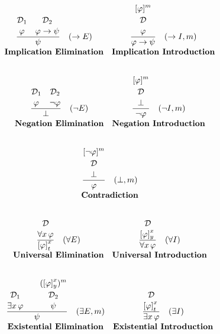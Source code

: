 \[
\begin{array}{c c}
\frac{\overset{\displaystyle\mathcal{D}_1\strut}{\displaystyle \varphi \strut}\quad \overset{\displaystyle\mathcal{D}_2\strut} {\displaystyle \varphi \to \psi \strut}}{\displaystyle\psi\strut} \quad (\to E) 
& \frac{\overset{\displaystyle[\varphi]^m\strut}{\overset{\displaystyle\mathcal{D} \strut} {\displaystyle\varphi 
\strut}}}{\displaystyle \varphi \to \psi \strut} \quad (\to I, m) \\[5pt]
\textbf{Implication Elimination} & \textbf{Implication Introduction}\\[10pt]
\end{array}
\]

\[
\begin{array}{c c}
\frac{\overset{\displaystyle\mathcal{D}_1\strut}{\displaystyle \varphi \strut}\quad \overset{\displaystyle\mathcal{D}_2\strut} {\displaystyle \neg \varphi \strut}}{\displaystyle\bot\strut} \quad (\neg E) 
& \frac{\overset{\displaystyle[\varphi]^m\strut}{\overset{\displaystyle\mathcal{D} \strut} {\displaystyle\bot 
\strut}}}{\displaystyle\neg \varphi\strut} \quad (\neg I, m) \\[5pt]
\textbf{Negation Elimination} & \textbf{Negation Introduction}\\[10pt]
\end{array}
\]

\[
\begin{array}{c c}
\multicolumn{2}{c}{
\frac{\overset{\displaystyle[\neg\varphi]^m\strut}{\overset{\displaystyle\mathcal{D} \strut} {\displaystyle\bot 
\strut}}}{\displaystyle \varphi\strut} \quad (\bot, m)
} \\[5pt]
\multicolumn{2}{c}{\textbf{Contradiction}} \\[10pt]
\end{array}
\]

\[
\begin{array}{c c}
\frac{{\overset{\displaystyle\mathcal{D} \strut} {\displaystyle\forall x \, \varphi 
\strut}}}{\displaystyle\left[ \varphi \right]^x_{\substack{t}}\strut} \quad (\forall E)
& \frac{{\overset{\displaystyle\mathcal{D} \strut} {\displaystyle\left[ \varphi\right]^x_{\substack{y}} 
\strut}}}{\displaystyle\forall x \, \varphi\strut} \quad (\forall I) \\[5pt]
\textbf{Universal Elimination} & \textbf{Universal Introduction}\\[10pt]
\end{array}
\]

\[
\begin{array}{c c}
\frac{\overset{\displaystyle\mathcal{D}_1 \strut} {\displaystyle\exists x \, \varphi \strut} \quad \quad \overset{\displaystyle(\left[ \varphi \right]^x_{\substack{y}})^m\strut}{\overset{\displaystyle\mathcal{D}_2 \strut} {\displaystyle\psi 
\strut}}}{\displaystyle\psi\strut} \quad (\exists E, m)
& \frac{{\overset{\displaystyle\mathcal{D} \strut} {\displaystyle\left[ \varphi \right]^x_{\substack{t}} 
\strut}}}{\displaystyle\exists x \, \varphi\strut} \quad (\exists I) \\[5pt]
\textbf{Existential Elimination} & \textbf{Existential Introduction}\\[10pt]
\end{array}
\]